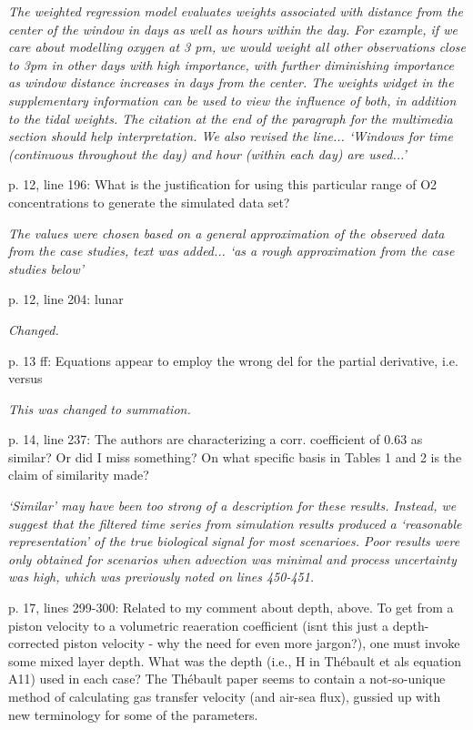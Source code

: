 \documentclass[letterpaper,12pt]{article}\usepackage[]{graphicx}\usepackage[]{color}
\begin{document}
{\it The weighted regression model evaluates weights associated with distance from the center of the window in days as well as hours within the day.  For example, if we care about modelling oxygen at 3 pm, we would weight all other observations close to 3pm in other days with high importance, with further diminishing importance as window distance increases in days from the center.  The weights widget in the supplementary information can be used to view the influence of both, in addition to the tidal weights.  The citation at the end of the paragraph for the multimedia section should help interpretation.  We also revised the line... `Windows for time (continuous throughout the day) and hour (within each day) are used...'
}

p. 12, line 196: What is the justification for using this particular range of O2 concentrations to generate the simulated data set?

{\it The values were chosen based on a general approximation of the observed data from the case studies, text was added... `as a rough approximation from the case studies below'}

p. 12, line 204: lunar

{\it Changed.}

p. 13 ff: Equations appear to employ the wrong del for the partial derivative, i.e. versus

{\it This was changed to summation.}

p. 14, line 237: The authors are characterizing a corr. coefficient of 0.63 as similar? Or did I
miss something? On what specific basis in Tables 1 and 2 is the claim of similarity made?

{\it `Similar' may have been too strong of a description for these results.  Instead, we suggest that the filtered time series from simulation results produced a `reasonable representation' of the true biological signal for most scenarioes.  Poor results were only obtained for scenarios when advection was minimal and process uncertainty was high, which was previously noted on lines 450-451.}

p. 17, lines 299-300: Related to my comment about depth, above. To get from a piston velocity
to a volumetric reaeration coefficient (isnt this just a depth-corrected piston velocity - why the need for even more jargon?), one must invoke some mixed layer depth. What was the depth (i.e., H in Thébault et als equation A11) used in each case? The Thébault paper seems to contain a not-so-unique method of calculating gas transfer velocity (and air-sea flux), gussied up with new terminology for some of the parameters.
\end{document}
